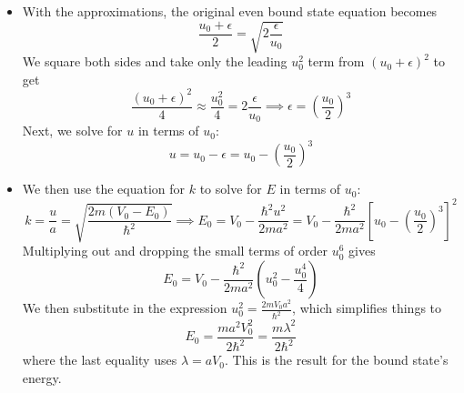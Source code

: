 \documentclass[11pt, a4paper]{article}
\begin{document}
\begin{itemize}
	
	\item With the approximations, the original even bound state equation becomes
	\begin{equation*}
		\frac{u_{0} + \epsilon}{2} = \sqrt{2\frac{\epsilon}{u_{0}}}
	\end{equation*}
	We square both sides and take only the leading $ u_{0}^{2} $ term from $ (u_{0} + \epsilon)^{2} $ to get
	\begin{equation*}
		\frac{(u_{0} + \epsilon)^{2}}{4} \approx \frac{u_{0}^{2}}{4} = 2 \frac{\epsilon}{u_{0}} \implies \epsilon = \left(\frac{u_{0}}{2}\right)^{3}
	\end{equation*}
	Next, we solve for $ u $ in terms of $ u_{0} $:
	\begin{equation*}
		u = u_{0} - \epsilon = u_{0} - \left(\frac{u_{0}}{2}\right)^{3}
	\end{equation*}
	
	\item We then use the equation for $ k $ to solve for $ E $ in terms of $ u_{0} $:
	\begin{equation*}
		k = \frac{u}{a} = \sqrt{\frac{2m(V_{0}- E_{0})}{\hbar^{2}}} \implies E_{0} = V_{0} - \frac{\hbar^{2}u^{2}}{2ma^{2}} = V_{0} - \frac{\hbar^{2}}{2ma^{2}}\left[u_{0} - \left(\frac{u_{0}}{2}\right)^{3}\right]^{2}
	\end{equation*}
	Multiplying out and dropping the small terms of order $ u_{0}^{6} $ gives
	\begin{equation*}
		E_{0} = V_{0} - \frac{\hbar^{2}}{2ma^{2}}\left(u_{0}^{2} - \frac{u_{0}^{4}}{4}\right)
	\end{equation*}
	We then substitute in the expression $ u_{0}^{2} = \frac{2mV_{0}a^{2}}{\hbar^{2}} $, which simplifies things to
	\begin{equation*}
		E_{0} = \frac{ma^{2}V_{0}^{2}}{2\hbar^{2}} = \frac{m\lambda^{2}}{2\hbar^{2}}
	\end{equation*}
	where the last equality uses $ \lambda = a V_{0} $. This is the result for the bound state's energy. 
	

\end{itemize}
\end{document}
